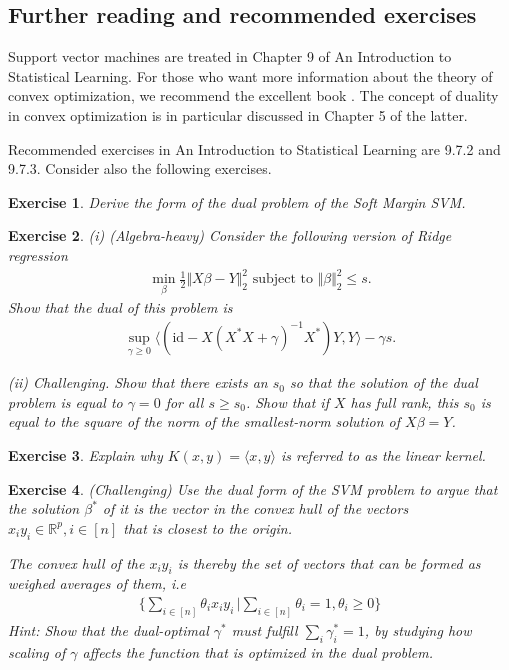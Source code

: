 \documentclass{article}
\newcommand{\id}{\mathrm{id}}
\newcommand{\sprod}[1]{\langle #1 \rangle}
\newcommand{\R}{\mathbb{R}}
\newtheorem{exercise}{Exercise}
\newcommand{\norm}[1]{\Vert #1 \Vert}
\begin{document}
\subsection{Further reading and recommended exercises}

Support vector machines are treated in Chapter 9 of An Introduction to Statistical Learning. For those who want more information about the theory of convex optimization, we recommend the excellent book \cite{boyd2004convex}. The concept of duality in convex optimization is in particular discussed in Chapter 5 of the latter.

Recommended exercises in An Introduction to Statistical Learning are 9.7.2 and 9.7.3. Consider also the following exercises.

\begin{exercise}
    Derive the form of the dual problem of the Soft Margin SVM.
\end{exercise}

\begin{exercise}
    (i) (\emph{Algebra-heavy}) Consider the following version of Ridge regression
    \begin{align*}
        \min_{\beta} \tfrac{1}{2}\norm{X\beta-Y}_2^2 \text{ subject to } \norm{\beta}_2^2 \leq s.
    \end{align*}
    Show that the dual of this problem is
    \begin{align*}
        \sup_{\gamma \geq 0 } \sprod{(\id - X(X^*X+\gamma)^{-1}X^*)Y,Y} -\gamma s.
    \end{align*}

    (ii) \emph{Challenging}. Show that there exists an $s_0$ so that the solution of the dual problem is equal to $\gamma=0$ for all $s\geq s_0$. Show that if $X$ has full rank, this $s_0$ is equal to the square of the norm of the smallest-norm solution of $X\beta=Y$.
\end{exercise}

\begin{exercise}
    Explain why $K(x,y) = \sprod{x,y}$ is referred to as the \emph{linear kernel}.
\end{exercise}

\begin{exercise}
    (\emph{Challenging}) Use the dual form of the SVM problem to argue that the solution $\beta^*$ of it is the vector in the \emph{convex hull} of the vectors $x_iy_i \in \R^p, i\in[n]$ that is closest to the origin. 
    
    The convex hull of the $x_iy_i$ is thereby the set of vectors that can be formed as weighed averages of them, i.e
    \begin{align*}
        \{ \sum_{i \in [n]} \theta_i x_iy_i \, \vert \sum_{i\in [n]} \theta_i= 1, \theta_i \geq 0 \}
    \end{align*}
    \emph{Hint}: Show that the dual-optimal $\gamma^*$ must fulfill $\sum_i \gamma_i^*=1$, by studying how scaling of $\gamma$ affects the function that is optimized in the dual problem.
\end{exercise}
\end{document}
